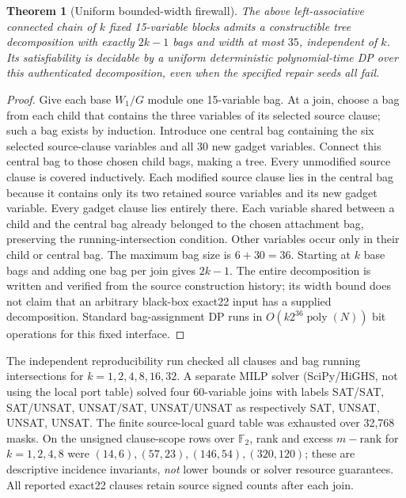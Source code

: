 \documentclass[10pt]{article}
\newtheorem{theorem}{Theorem}
\begin{document}
\begin{theorem}[Uniform bounded-width firewall]\label{thm:width}
The above left-associative connected chain of $k$ fixed 15-variable blocks admits a constructible tree decomposition with exactly $2k-1$ bags and width at most $35$, independent of $k$. Its satisfiability is decidable by a uniform deterministic polynomial-time DP over this authenticated decomposition, even when the specified repair seeds all fail.
\end{theorem}
\begin{proof}
Give each base $W_1/G$ module one 15-variable bag. At a join, choose a bag from each child that contains the three variables of its selected source clause; such a bag exists by induction. Introduce one central bag containing the six selected source-clause variables and all 30 new gadget variables. Connect this central bag to those chosen child bags, making a tree. Every unmodified source clause is covered inductively. Each modified source clause lies in the central bag because it contains only its two retained source variables and its new gadget variable. Every gadget clause lies entirely there. Each variable shared between a child and the central bag already belonged to the chosen attachment bag, preserving the running-intersection condition. Other variables occur only in their child or central bag. The maximum bag size is $6+30=36$. Starting at $k$ base bags and adding one bag per join gives $2k-1$. The entire decomposition is written and verified from the source construction history; its width bound does not claim that an arbitrary black-box exact22 input has a supplied decomposition. Standard bag-assignment DP runs in $O(k 2^{36}\operatorname{poly}(N))$ bit operations for this fixed interface.\end{proof}

The independent reproducibility run checked all clauses and bag running intersections for $k=1,2,4,8,16,32$. A separate MILP solver (SciPy/HiGHS, not using the local port table) solved four 60-variable joins with labels SAT/SAT, SAT/UNSAT, UNSAT/SAT, UNSAT/UNSAT as respectively SAT, UNSAT, UNSAT, UNSAT. The finite source-local guard table was exhausted over 32,768 masks. On the unsigned clause-scope rows over $\mathbb F_2$, rank and excess $m-\mathrm{rank}$ for $k=1,2,4,8$ were $(14,6),(57,23),(146,54),(320,120)$; these are descriptive incidence invariants, \emph{not} lower bounds or solver resource guarantees. All reported exact22 clauses retain source signed counts after each join.
\end{document}
